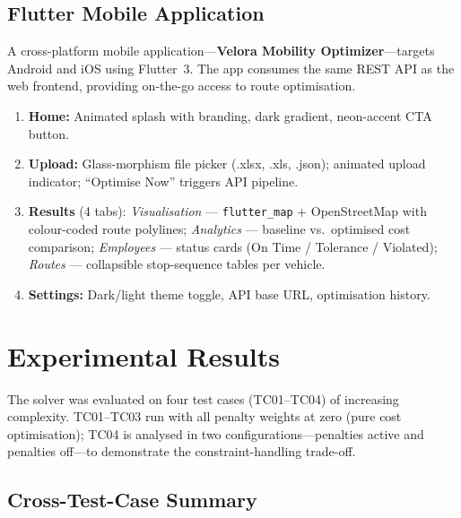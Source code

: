 \documentclass[11pt,a4paper]{article}
\newcommand{\code}[1]{\texttt{#1}}
\begin{document}
\subsection{Flutter Mobile Application}

A cross-platform mobile application---\textbf{Velora Mobility Optimizer}---targets Android and iOS using Flutter~3. The app consumes the same REST API as the web frontend, providing on-the-go access to route optimisation.

\begin{hackbox}
\small
\begin{enumerate}[nosep, leftmargin=1.4em]
    \item \textbf{Home:} Animated splash with branding, dark gradient, neon-accent CTA button.
    \item \textbf{Upload:} Glass-morphism file picker (.xlsx, .xls, .json); animated upload indicator; ``Optimise Now'' triggers API pipeline.
    \item \textbf{Results} (4 tabs):
    \textit{Visualisation} --- \code{flutter\_map} + OpenStreetMap with colour-coded route polylines;
    \textit{Analytics} --- baseline vs.\ optimised cost comparison;
    \textit{Employees} --- status cards (On Time / Tolerance / Violated);
    \textit{Routes} --- collapsible stop-sequence tables per vehicle.
    \item \textbf{Settings:} Dark/light theme toggle, API base URL, optimisation history.
\end{enumerate}
\end{hackbox}

\section{Experimental Results}

The solver was evaluated on four test cases (TC01--TC04) of increasing complexity. TC01--TC03 run with all penalty weights at zero (pure cost optimisation); TC04 is analysed in two configurations---penalties active and penalties off---to demonstrate the constraint-handling trade-off.

\subsection{Cross-Test-Case Summary}
\end{document}
